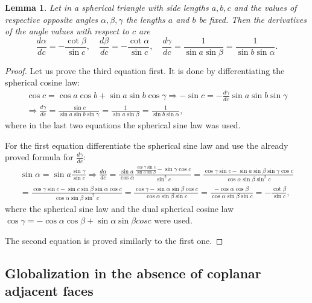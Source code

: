 \documentclass{amsart}
\newtheorem{lem}[thm]{Lemma}
\theoremstyle{definition}
\begin{document}
\begin{lem}
\label{lem:SphTrig}
Let in a spherical triangle with side lengths $a, b, c$ and the values of respective opposite angles $\alpha, \beta, \gamma$ the lengths $a$ and $b$ be fixed.
Then the derivatives of the angle values with respect to $c$ are
\[
\frac{d\alpha}{dc} = -\frac{\cot\beta}{\sin c}, \quad
\frac{d\beta}{dc} = -\frac{\cot\alpha}{\sin c}, \quad
\frac{d\gamma}{dc} = \frac{1}{\sin a \sin\beta} = \frac{1}{\sin b \sin\alpha}.
\]
\end{lem}
\begin{proof}
Let us prove the third equation first.
It is done by differentiating the spherical cosine law:
\begin{multline*}
\cos c = \cos a \cos b + \sin a \sin b \cos\gamma \Rightarrow
-\sin c = - \frac{d\gamma}{dc}\sin a \sin b \sin\gamma\\
\Rightarrow \frac{d\gamma}{dc} = \frac{\sin c}{\sin a \sin b \sin \gamma} = \frac{1}{\sin a \sin\beta} = \frac{1}{\sin b \sin\alpha},
\end{multline*}
where in the last two equations the spherical sine law was used.

For the first equation differentiate the spherical sine law and use the already proved formula for $\frac{d\gamma}{dc}$:
\begin{multline*}
\sin\alpha = \sin a \frac{\sin\gamma}{\sin c} \Rightarrow
\frac{d\alpha}{dc} = \frac{\sin a}{\cos\alpha} \frac{\frac{\cos\gamma \sin c}{\sin a \sin\beta} - \sin\gamma \cos c}{\sin^2 c} = \frac{\cos\gamma \sin c - \sin a \sin\beta \sin\gamma \cos c}{\cos\alpha \sin\beta \sin^2 c}\\
= \frac{\cos\gamma \sin c - \sin c \sin\beta \sin\alpha \cos c}{\cos\alpha \sin\beta \sin^2 c} = \frac{\cos\gamma - \sin\alpha \sin\beta \cos c}{\cos\alpha \sin\beta \sin c} = \frac{-\cos\alpha \cos\beta}{\cos\alpha \sin\beta \sin c} = - \frac{\cot\beta}{\sin c},
\end{multline*}
where the spherical sine law and the dual spherical cosine law $\cos\gamma = -\cos\alpha\cos\beta + \sin\alpha\sin\beta cos c$ were used.

The second equation is proved similarly to the first one.
\end{proof}



\subsection{Globalization in the absence of coplanar adjacent faces}
\end{document}
